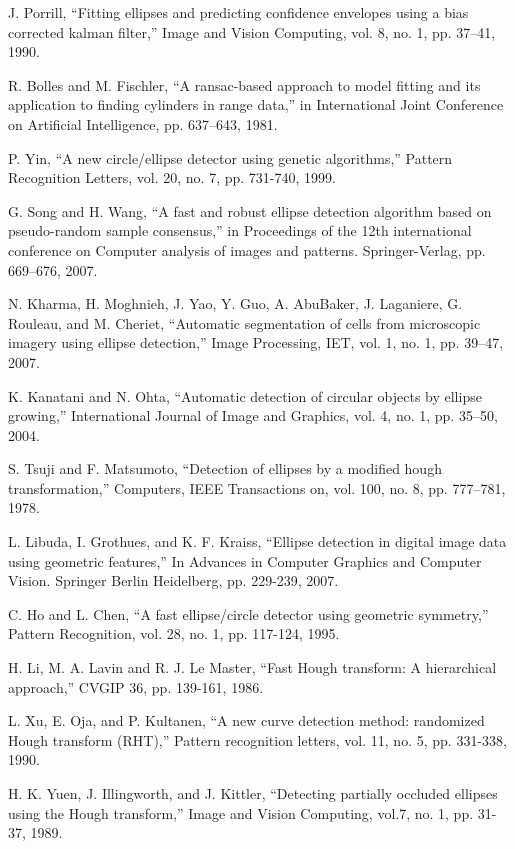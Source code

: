 \documentclass[12pt,a4paper]{article}
\numberwithin{equation}{section}
\numberwithin{figure}{section}
\theoremstyle{definition}
\theoremstyle{theorem}
\theoremstyle{definition}
\begin{document}
\begin{thebibliography}{99}
\begin{LTRitems}
J. Porrill, “Fitting ellipses and predicting confidence envelopes using a bias corrected kalman filter,” Image and Vision Computing, vol. 8, no. 1, pp. 37–41, 1990.

R. Bolles and M. Fischler, “A ransac-based approach to model fitting and its application to finding cylinders in range data,” in International Joint Conference on Artificial Intelligence, pp. 637–643, 1981.

P. Yin, “A new circle/ellipse detector using genetic algorithms,” Pattern Recognition Letters, vol. 20, no. 7, pp. 731-740, 1999.

G. Song and H. Wang, “A fast and robust ellipse detection algorithm based on pseudo-random sample consensus,” in Proceedings of the 12th international conference on Computer analysis of images and patterns. Springer-Verlag, pp. 669–676, 2007.

N. Kharma, H. Moghnieh, J. Yao, Y. Guo, A. AbuBaker, J. Laganiere, G. Rouleau, and M. Cheriet, “Automatic segmentation of cells from microscopic imagery using ellipse detection,” Image Processing, IET, vol. 1, no. 1, pp. 39–47, 2007.

K. Kanatani and N. Ohta, “Automatic detection of circular objects by ellipse growing,” International Journal of Image and Graphics, vol. 4, no. 1, pp. 35–50, 2004.

S. Tsuji and F. Matsumoto, “Detection of ellipses by a modified hough transformation,” Computers, IEEE Transactions on, vol. 100, no. 8, pp. 777–781, 1978.

L. Libuda, I. Grothues, and K. F. Kraiss, “Ellipse detection in digital image data using geometric features,” In Advances in Computer Graphics and Computer Vision. Springer Berlin Heidelberg, pp. 229-239, 2007. 

C. Ho and L. Chen, “A fast ellipse/circle detector using geometric symmetry,” Pattern Recognition, vol. 28, no. 1, pp. 117-124, 1995.

H. Li, M. A. Lavin and R. J. Le Master, “Fast Hough transform: A hierarchical approach,” CVGIP 36, pp. 139-161, 1986.

L. Xu, E. Oja, and P. Kultanen, “A new curve detection method: randomized Hough transform (RHT),” Pattern recognition letters, vol. 11, no. 5, pp. 331-338, 1990.

H. K. Yuen, J. Illingworth, and J. Kittler, “Detecting partially occluded ellipses using the Hough transform,” Image and Vision Computing, vol.7, no. 1, pp. 31-37, 1989.


\end{LTRitems}
\end{thebibliography}
\end{document}
